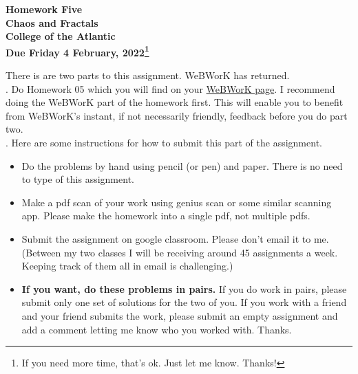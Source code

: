 \documentclass[12pt]{article}
\begin{document}
\pagestyle{empty}
 
\begin{center}
{\LARGE {\bf Homework Five}}\\
\bigskip
{\Large {\bf Chaos and Fractals}}\\
\bigskip
{\Large {\bf College of the Atlantic}}\\
\bigskip
{ {\bf Due Friday 4 February, 2022\footnote{If you need more time,
      that's ok. Just let me know. Thanks!}}}\\  
\end{center}
\medskip



\noindent There is are two parts to this assignment. WeBWorK has
returned.\\ 

.
Do Homework 05 which you will find
on your
\href{https://webwork.runestone.academy/webwork2/coa-feldman-es1026i-winter-2022}{WeBWorK
  page}.  I recommend doing the WeBWorK part of the 
homework first.  This will enable you to benefit from WeBWorK's
instant, if not necessarily friendly, feedback before you do part two.\\

.  Here are some
instructions for how to submit this part of the assignment.
\begin{itemize}
\item Do the problems by hand using pencil (or pen) and paper.
  There is no need to type of this assignment.
\item Make a pdf scan of your work using genius scan or some
  similar scanning app.  Please make the homework into a single
  pdf, not multiple pdfs.
\item Submit the assignment on google classroom.  Please don't
  email it to me.  (Between my two classes I will be receiving
  around 45 assignments a week.  Keeping track of them all in email
  is challenging.)
\item {\bf If you want, do these problems in pairs.} %
  If you do work in pairs,
  please submit only one set of solutions for the two of you.  If you
  work with a friend and your friend submits the work, please submit
  an empty assignment and add a comment letting me know who you worked
  with.  Thanks.
\end{itemize}
\end{document}
